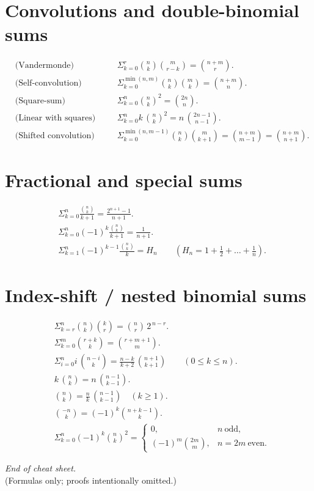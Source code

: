 \documentclass[11pt,a4paper]{article}
\begin{document}
\section*{Convolutions and double-binomial sums}
\begin{align*}
&\text{(Vandermonde)}\qquad 
&&\Sigma_{k=0}^{r}\binom{n}{k}\binom{m}{r-k}=\binom{n+m}{r}.\\[6pt]
&\text{(Self-convolution)}\qquad 
&&\Sigma_{k=0}^{\min(n,m)}\binom{n}{k}\binom{m}{k}=\binom{n+m}{n}.\\[6pt]
&\text{(Square-sum)}\qquad 
&&\Sigma_{k=0}^{n}\binom{n}{k}^{2}=\binom{2n}{n}.\\[6pt]
&\text{(Linear with squares)}\qquad 
&&\Sigma_{k=0}^{n} k\,\binom{n}{k}^{2} = n\,\binom{2n-1}{\,n-1\,}.\\[6pt]
&\text{(Shifted convolution)}\qquad 
&&\Sigma_{k=0}^{\min(n,m-1)} \binom{n}{k}\binom{m}{k+1} 
= \binom{n+m}{m-1} = \binom{n+m}{n+1}.
\end{align*}

\section*{Fractional and special sums}
\begin{align*}
&\Sigma_{k=0}^{n}\frac{\binom{n}{k}}{k+1} = \frac{2^{n+1}-1}{n+1}.\\[6pt]
&\Sigma_{k=0}^{n}(-1)^{k}\frac{\binom{n}{k}}{k+1} = \frac{1}{n+1}.\\[6pt]
&\Sigma_{k=1}^{n} (-1)^{k-1}\frac{\binom{n}{k}}{k} = H_{n}\qquad(H_n=1+\tfrac12+\dots+\tfrac1n).
\end{align*}

\section*{Index-shift / nested binomial sums}
\begin{align*}
&\Sigma_{k=r}^{n} \binom{n}{k}\binom{k}{r} = \binom{n}{r}\,2^{\,n-r}.\\[6pt]
&\Sigma_{k=0}^{m}\binom{r+k}{k} = \binom{r+m+1}{m}.\\[6pt]
&\Sigma_{i=0}^{n} i\,\binom{n-i}{k} = \frac{n-k}{k+2}\,\binom{n+1}{k+1}\qquad(0\le k\le n).\\[12pt]
& k\,\binom{n}{k} = n\,\binom{n-1}{k-1}.\\[6pt]
& \binom{n}{k} = \frac{n}{k}\,\binom{n-1}{k-1}\quad(k\ge1).\\[6pt]
& \binom{-n}{k} = (-1)^{k}\binom{n+k-1}{k}.\\[6pt]
& \Sigma_{k=0}^{n} (-1)^{k}\binom{n}{k}^{2} =
\begin{cases}
0, & n\ \text{odd},\\[4pt]
(-1)^{m}\binom{2m}{m}, & n=2m\ \text{even}.
\end{cases}
\end{align*}

\bigskip
\noindent\textit{End of cheat sheet.} \\
\noindent (Formulas only; proofs intentionally omitted.)
\end{document}
